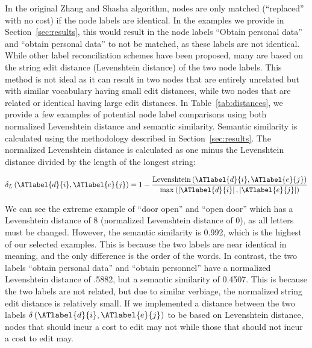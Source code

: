 In the original Zhang and Shasha algorithm, nodes are only matched (``replaced'' with no cost) if the node labels are identical. In the examples we provide in Section~\ref{sec:results}, this would result in the node labels ``Obtain personal data'' and ``obtain personal data'' to not be matched, as these labels are not identical. While other label reconciliation schemes have been proposed, many are based on the string edit distance (Levenshtein distance) of the two node labels. This method is not ideal as it can result in two nodes that are entirely unrelated but with similar vocabulary having small edit distances, while two nodes that are related or identical having large edit distances. In Table~\ref{tab:distances}, we provide a few examples of potential node label comparisons using both normalized Levenshtein distance and semantic similarity. Semantic similarity is calculated using the methodology described in Section~\ref{sec:results}. The normalized Levenshtein distance is calculated as one minus the Levenshtein distance divided by the length of the longest string:

\[
    \delta_L\left(\ATlabel{d}{i}, \ATlabel{e}{j}\right) = 1 - \frac{\text{Levenshtein}\left(\ATlabel{d}{i}, \ATlabel{e}{j}\right)}{\max\left(\left|\ATlabel{d}{i}\right|, \left|\ATlabel{e}{j}\right|\right)}
\]

We can see the extreme example of ``door open'' and ``open door'' which has a Levenshtein distance of 8 (normalized Levenshtein distance of 0), as all letters must be changed. However, the semantic similarity is 0.992, which is the highest of our selected examples. This is because the two labels are near identical in meaning, and the only difference is the order of the words. In contrast, the two labels ``obtain personal data'' and ``obtain personnel'' have a normalized Levenshtein distance of .5882, but a semantic similarity of 0.4507. This is because the two labels are not related, but due to similar verbiage, the normalized string edit distance is relatively small. If we implemented a distance between the two labels  $\delta\left(\ATlabel{d}{i}, \ATlabel{e}{j}\right)$ to be based on Levenshtein distance, nodes that should incur a cost to edit may not while those that should not incur a cost to edit may.

